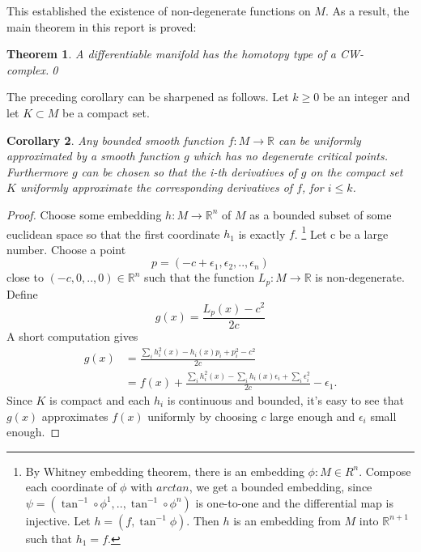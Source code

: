 \documentclass[a4paper,11pt,reqno]{amsart}
\newtheorem{thm}{Theorem}[section]
\newtheorem{cor}[thm]{Corollary}
\newcommand{\RR}{\mathbb{R}}      %
\begin{document}
This established the existence of non-degenerate functions on $M$. As a result,
the main theorem in this report is proved:

\begin{thm}
  A differentiable manifold has the homotopy type of a CW-complex.\qed
\end{thm}


The preceding corollary can be sharpened as follows. Let $k \ge 0$ be an integer
and let $K \subset M$ be a compact set.

\begin{cor}
  Any bounded smooth function $f: M \to \RR$ can be uniformly approximated by a
  smooth function $g$ which has no degenerate critical points. Furthermore $g$
  can be chosen so that the i-th derivatives of $g$ on the compact set $K$
  uniformly approximate the corresponding derivatives of $f$, for $i \le k$.
\end{cor}

\begin{proof}
  Choose some embedding $h:M \to \RR^n$ of $M$ as a bounded subset of some
  euclidean space so that the first coordinate $h_1$ is exactly
  $f$. \footnote{By Whitney embedding theorem, there is an embedding $\phi : M
    \in R^n$. Compose each coordinate of $\phi$ with $arctan$, we get a bounded
    embedding, since $\psi = (\tan^{-1} \circ \phi^1, .., \tan^{-1} \circ
    \phi^n)$ is one-to-one and the differential map is injective. Let $h = (f,
    \tan^{-1}\phi)$. Then $h$ is an embedding from $M$ into $\RR^{n+1}$ such
    that $h_1 = f$.} Let c be a large number. Choose a point
  \begin{equation}
    p = (-c+\epsilon_1, \epsilon_2, .., \epsilon_n)
  \end{equation}
  close to $(-c, 0, .., 0) \in \RR^n$ such that the function $L_p: M \to \RR$ is
  non-degenerate. Define
  \begin{equation}
    g(x) = \frac{L_p(x)-c^2}{2c}
  \end{equation}
  A short computation gives
  \begin{equation}
    \begin{aligned}
      g(x) &= \frac{\sum_i h_i^2(x)-h_i(x)p_i+p_i^2-c^2}{2c} \\
           &= f(x) + \frac{\sum_i h_i^2(x)-\sum_i h_i(x)\epsilon_i+\sum_i \epsilon_i^2}{2c}-\epsilon_1.
    \end{aligned}
  \end{equation}
  Since $K$ is compact and each $h_i$ is continuous and bounded, it's easy to
  see that $g(x)$ approximates $f(x)$ uniformly by choosing $c$ large enough and
  $\epsilon_i$ small enough. 
\end{proof}
\end{document}
